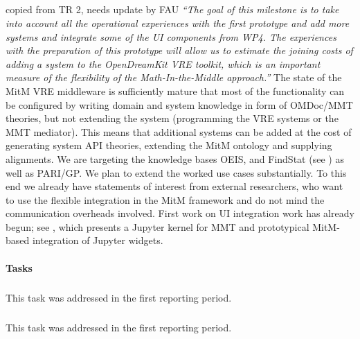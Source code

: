 \subparagraph{}
\begin{oldpart}{copied from TR 2, needs update by FAU}
\emph{“The goal of this milestone is to take into account all the operational experiences with the first prototype and add more systems and integrate some of the UI components from WP4.
  The experiences with the preparation of this prototype will allow us to estimate the joining costs of adding a system to the OpenDreamKit VRE toolkit, which is an important measure of the flexibility of the Math-In-the-Middle approach.”}
The state of the MitM VRE middleware is sufficiently mature that most of the functionality can be configured by writing domain and system knowledge in form of OMDoc/MMT theories, but not extending the system (programming the VRE systems or the MMT mediator).
This means that additional systems can be added at the cost of generating system API theories, extending the  MitM ontology and supplying alignments.
We are targeting the knowledge bases OEIS, and FindStat (see ) as well as PARI/GP.
We plan to extend the worked use cases substantially.
To this end we already have statements of interest from external researchers, who want to use the flexible integration in the MitM framework and do not mind the communication overheads involved. 
First work on UI integration work has already begun; see  , which presents a Jupyter kernel for MMT and prototypical MitM-based integration of Jupyter widgets.
\end{oldpart}

\paragraph{Tasks}
\medskip

\subparagraph{}
\label{dksbases@data-assessment}
This task was addressed in the first reporting period.
\medskip

\subparagraph{}
\label{dksbases@data-triform}
This task was addressed in the first reporting period.
\medskip

